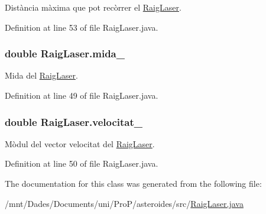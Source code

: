 Distància màxima que pot recòrrer el \hyperlink{class_raig_laser}{Raig\+Laser}. 



Definition at line 53 of file Raig\+Laser.\+java.

\hypertarget{class_raig_laser_ac18a272d02d6d090eebee561f05c1a0a}{}
\subsubsection[{mida\+\_\+}]{\setlength{\rightskip}{0pt plus 5cm}double Raig\+Laser.\+mida\+\_\+\hspace{0.3cm}{\ttfamily [private]}}\label{class_raig_laser_ac18a272d02d6d090eebee561f05c1a0a}


Mida del \hyperlink{class_raig_laser}{Raig\+Laser}. 



Definition at line 49 of file Raig\+Laser.\+java.

\hypertarget{class_raig_laser_af4bf8a2a716caaa467e7a01ca1566924}{}
\subsubsection[{velocitat\+\_\+}]{\setlength{\rightskip}{0pt plus 5cm}double Raig\+Laser.\+velocitat\+\_\+\hspace{0.3cm}{\ttfamily [private]}}\label{class_raig_laser_af4bf8a2a716caaa467e7a01ca1566924}


Mòdul del vector velocitat del \hyperlink{class_raig_laser}{Raig\+Laser}. 



Definition at line 50 of file Raig\+Laser.\+java.



The documentation for this class was generated from the following file\+:\begin{DoxyCompactItemize}
\item 
/mnt/\+Dades/\+Documents/uni/\+Pro\+P/asteroides/src/\hyperlink{_raig_laser_8java}{Raig\+Laser.\+java}\end{DoxyCompactItemize}
